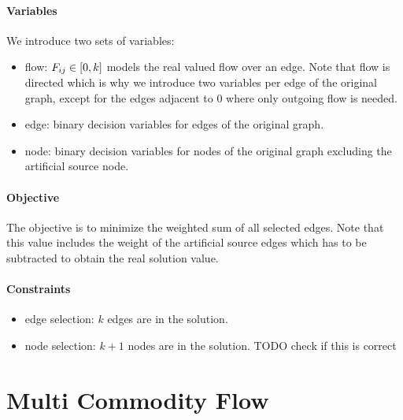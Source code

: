 \documentclass{article}
\begin{document}
\paragraph{Variables} We introduce two sets of variables:
\begin{itemize}
	\item flow: $F_{ij} \in [0, k]$ models the real valued flow over an edge. Note that flow is directed which is why we introduce two variables per edge of the original graph, except for the edges adjacent to $0$ where only outgoing flow is needed.
	\item edge: binary decision variables for edges of the original graph.
	\item node: binary decision variables for nodes of the original graph excluding the artificial source node. 
\end{itemize}

\paragraph{Objective} The objective is to minimize the weighted sum of all selected edges. Note that this value includes the weight of the artificial source edges which has to be subtracted to obtain the real solution value.
\paragraph{Constraints}
\begin{itemize}
	\item edge selection: $k$ edges are in the solution.
	\item node selection: $k + 1$ nodes are in the solution. TODO check if this is correct
\end{itemize}


\section{Multi Commodity Flow}
\end{document}
